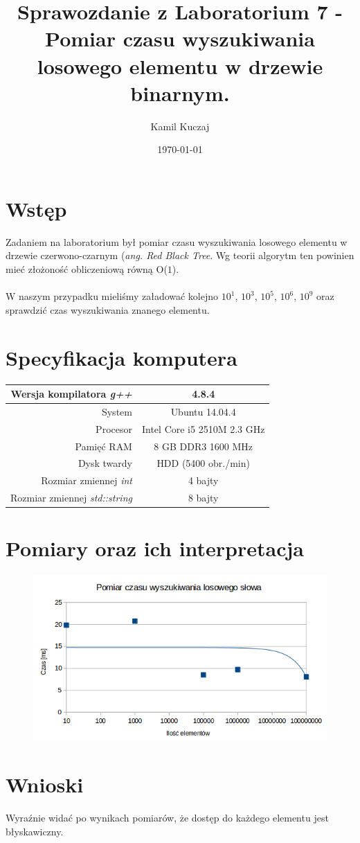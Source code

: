 \documentclass[11pt,a4paper]{article}
\author{Kamil Kuczaj}
\title{Sprawozdanie z Laboratorium 7 - Pomiar czasu wyszukiwania losowego elementu w drzewie binarnym.}
\date{\today}
\begin{document}
\maketitle

\section{Wstęp}
\hspace{4ex}Zadaniem na laboratorium był pomiar czasu wyszukiwania losowego elementu w drzewie czerwono-czarnym (\textit{ang. Red Black Tree}. Wg teorii algorytm ten powinien mieć złożoność obliczeniową równą O($1$).\\\\W naszym przypadku mieliśmy załadować kolejno $10^1$, $10^3$, $10^5$, $10^6$, $10^9$ oraz sprawdzić czas wyszukiwania znanego elementu.
\section{Specyfikacja komputera}

\begin{center}
	\begin{tabular}{| r | c |}
	\hline
	Wersja kompilatora \textit{g++} & 4.8.4 \\ \hline
	System & Ubuntu 14.04.4 \\ \hline
	Procesor	 & Intel Core i5 2510M 2.3 GHz \\ \hline
	Pamięć RAM & 8 GB DDR3 1600 MHz \\ \hline
	Dysk twardy & HDD (5400 obr./min) \\ \hline
	Rozmiar zmiennej \textit{int} & 4 bajty \\ \hline
	Rozmiar zmiennej \textit{std::string} & 8 bajty \\ \hline	
	\end{tabular}
\end{center}

\section{Pomiary oraz ich interpretacja}


\begin{figure}[htbp]
\begin{center}
	\includegraphics[scale=0.7]{../wyniki/wykres.png}
\end{center}
\end{figure}


\section{Wnioski}
\hspace{4ex}Wyraźnie widać po wynikach pomiarów, że dostęp do każdego elementu jest błyskawiczny.
\end{document}
